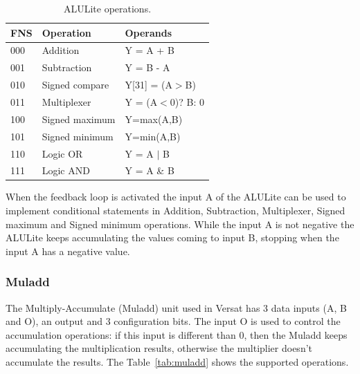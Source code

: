 \begin{table}[!htb]
	\renewcommand{\arraystretch}{1.2} %
	\caption{ALULite operations.}
	\label{tab:alulite}
	\centering
	\begin{tabular}{lll}
		\toprule
		FNS & Operation              &              Operands\\
		\midrule
		000 & Addition               &             Y = A + B\\
		001 & Subtraction            &             Y = B - A\\
		010 & Signed compare         &       Y[31] = (A$>$B)\\
		011 & Multiplexer            &     Y = (A$<$0)? B: 0\\
		100 & Signed maximum         &            Y=max(A,B)\\
		101 & Signed minimum         &            Y=min(A,B)\\
		110 & Logic OR               &           Y = A $|$ B\\
		111 & Logic AND              &            Y = A \& B\\
		\bottomrule
	\end{tabular}
\end{table}

When the feedback loop is activated the input A of the ALULite can be used to
implement conditional statements in Addition, Subtraction, Multiplexer, Signed
maximum and Signed minimum operations. While the input A is not negative the
ALULite keeps accumulating the values coming to input B, stopping when the input
A has a negative value.

\subsubsection{Muladd}
\label{subsubsection:muladd}

The Multiply-Accumulate (Muladd) unit used in Versat has 3 data inputs (A, B and
O), an output and 3 configuration bits. The input O is used to control the
accumulation operations: if this input is different than 0, then the Muladd
keeps accumulating the multiplication results, otherwise the multiplier doesn't
accumulate the results. The Table~\ref{tab:muladd} shows the supported
operations.

